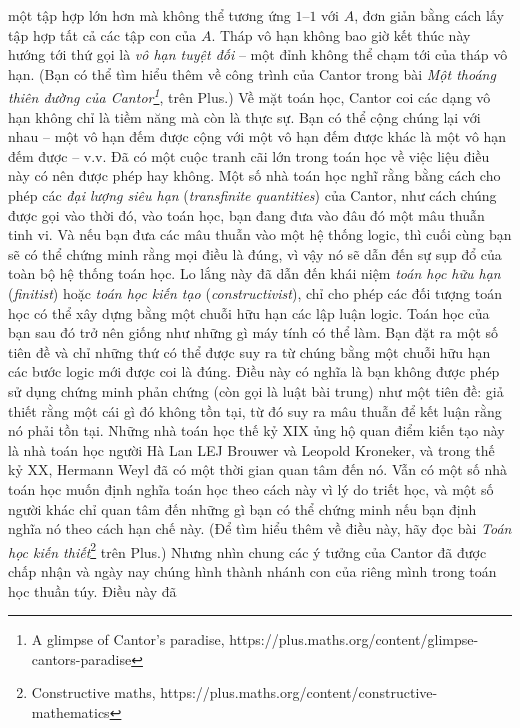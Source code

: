 \begin{multicols}{2}
	một tập hợp lớn hơn mà không thể tương ứng $1$--$1$ với $A$, đơn giản
	bằng cách lấy tập hợp tất cả các tập con của $A$. Tháp vô hạn không bao giờ
	kết thúc này hướng tới thứ gọi là \emph{vô hạn tuyệt đối} -- một đỉnh không thể chạm
	tới của tháp vô hạn. (Bạn có thể tìm hiểu thêm về công trình của Cantor trong
	bài \textit{Một thoáng thiên đường của Cantor\footnote{\color{quantoan}A glimpse of Cantor's
			paradise, https://plus.maths.org/content/glimpse-cantors-paradise}}, trên
	Plus.)
	\vskip 0.05cm
	Về mặt toán học, Cantor coi các dạng vô hạn không chỉ là tiềm năng mà còn là
	thực sự. Bạn có thể cộng chúng lại với nhau -- một vô hạn đếm được cộng
	với một vô hạn đếm được khác là một vô hạn đếm được -- v.v. Đã có
	một cuộc tranh cãi lớn trong toán học về việc liệu điều này có nên được phép
	hay không. Một số nhà toán học nghĩ rằng bằng cách cho phép các
	\emph{đại lượng siêu hạn} (\emph{transfinite quantities}) của Cantor, 
	như cách chúng được gọi vào thời đó, vào toán học, bạn đang
	đưa vào đâu đó một mâu thuẫn tinh vi. Và nếu bạn đưa các mâu thuẫn vào một hệ
	thống logic, thì cuối cùng bạn sẽ có thể chứng minh rằng mọi điều là
	đúng, vì vậy nó sẽ dẫn đến sự sụp đổ của toàn bộ hệ thống toán học.
	\vskip 0.05cm
	Lo lắng này đã dẫn đến khái niệm \emph{toán học hữu hạn} (\emph{finitist}) hoặc 
	\emph{toán học kiến tạo} (\emph{constructivist}), 
	chỉ cho phép các đối tượng toán học có thể xây dựng bằng một
	chuỗi hữu hạn các lập luận logic. Toán học của bạn sau đó trở nên giống như
	những gì máy tính có thể làm. Bạn đặt ra một số tiên đề và chỉ những
	thứ có thể được suy ra từ chúng bằng một chuỗi hữu hạn các bước logic mới được
	coi là đúng. Điều này có nghĩa là bạn không được phép sử dụng chứng minh phản
	chứng (còn gọi là luật bài trung) như một tiên đề: giả thiết rằng một cái gì đó
	không tồn tại, từ đó suy ra mâu thuẫn để kết luận rằng nó phải tồn tại. Những
	nhà toán học thế kỷ XIX ủng hộ quan điểm kiến tạo này là nhà toán học người Hà
	Lan LEJ Brouwer và Leopold Kroneker, và trong thế kỷ XX, Hermann Weyl đã 
	có một thời gian quan tâm đến nó. Vẫn có một số nhà toán học muốn định nghĩa
	toán học theo cách này vì lý do triết học, và một số người khác chỉ quan tâm
	đến những gì bạn có thể chứng minh nếu bạn định nghĩa nó theo cách hạn chế
	này. (Để tìm hiểu thêm về điều này, hãy đọc bài \textit{Toán học kiến
	thiết}\footnote{\color{quantoan}Constructive maths,
		https://plus.maths.org/content/constructive-mathematics}  trên Plus.)
	\vskip 0.05cm
	Nhưng nhìn chung các ý tưởng của Cantor đã được chấp nhận và ngày nay chúng
	hình thành nhánh con của riêng mình trong toán học thuần túy. Điều này đã

\end{multicols}

